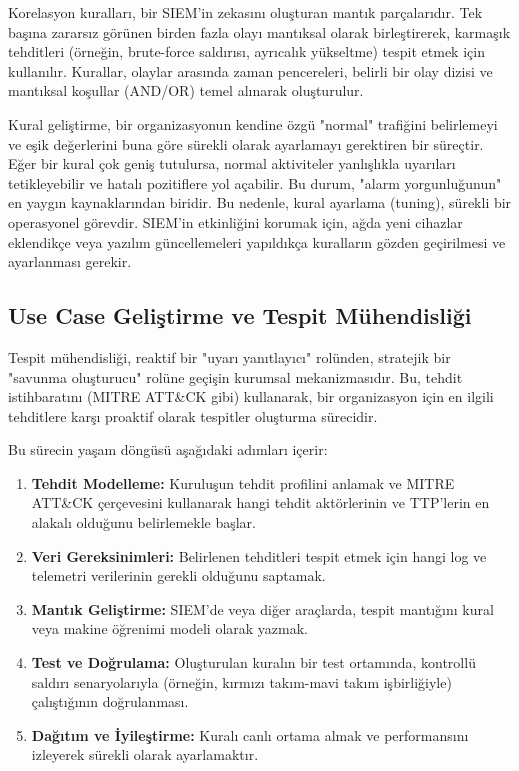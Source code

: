 Korelasyon kuralları, bir SIEM'in zekasını oluşturan mantık parçalarıdır. Tek başına zararsız görünen birden fazla olayı mantıksal olarak birleştirerek, karmaşık tehditleri (örneğin, brute-force saldırısı, ayrıcalık yükseltme) tespit etmek için kullanılır. Kurallar, olaylar arasında zaman pencereleri, belirli bir olay dizisi ve mantıksal koşullar (AND/OR) temel alınarak oluşturulur.

Kural geliştirme, bir organizasyonun kendine özgü "normal" trafiğini belirlemeyi ve eşik değerlerini buna göre sürekli olarak ayarlamayı gerektiren bir süreçtir. Eğer bir kural çok geniş tutulursa, normal aktiviteler yanlışlıkla uyarıları tetikleyebilir ve hatalı pozitiflere yol açabilir. Bu durum, "alarm yorgunluğunun" en yaygın kaynaklarından biridir. Bu nedenle, kural ayarlama (tuning), sürekli bir operasyonel görevdir. SIEM'in etkinliğini korumak için, ağda yeni cihazlar eklendikçe veya yazılım güncellemeleri yapıldıkça kuralların gözden geçirilmesi ve ayarlanması gerekir.

\subsection{Use Case Geliştirme ve Tespit Mühendisliği}

Tespit mühendisliği, reaktif bir "uyarı yanıtlayıcı" rolünden, stratejik bir "savunma oluşturucu" rolüne geçişin kurumsal mekanizmasıdır. Bu, tehdit istihbaratını (MITRE ATT\&CK gibi) kullanarak, bir organizasyon için en ilgili tehditlere karşı proaktif olarak tespitler oluşturma sürecidir.

Bu sürecin yaşam döngüsü aşağıdaki adımları içerir:
\begin{enumerate}
    \item \textbf{Tehdit Modelleme:} Kuruluşun tehdit profilini anlamak ve MITRE ATT\&CK çerçevesini kullanarak hangi tehdit aktörlerinin ve TTP'lerin en alakalı olduğunu belirlemekle başlar.
    \item \textbf{Veri Gereksinimleri:} Belirlenen tehditleri tespit etmek için hangi log ve telemetri verilerinin gerekli olduğunu saptamak.
    \item \textbf{Mantık Geliştirme:} SIEM'de veya diğer araçlarda, tespit mantığını kural veya makine öğrenimi modeli olarak yazmak.
    \item \textbf{Test ve Doğrulama:} Oluşturulan kuralın bir test ortamında, kontrollü saldırı senaryolarıyla (örneğin, kırmızı takım-mavi takım işbirliğiyle) çalıştığının doğrulanması.
    \item \textbf{Dağıtım ve İyileştirme:} Kuralı canlı ortama almak ve performansını izleyerek sürekli olarak ayarlamaktır.
\end{enumerate}

